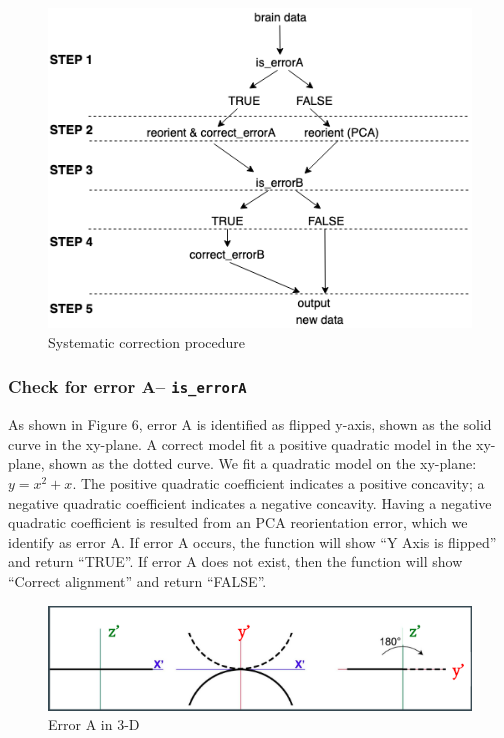 \documentclass[10pt,letterpaper]{article}
\begin{document}
\begin{figure}[H]
\includegraphics[width=0.9\linewidth]{visualization_paper/cranium_procedure} \caption{Systematic correction procedure}\label{fig:Figure5}
\end{figure}

\hypertarget{check-for-error-a-is_errora}{%
\subsubsection{\texorpdfstring{Check for error A--
\texttt{is\_errorA}}{Check for error A-- is\_errorA}}\label{check-for-error-a-is_errora}}

As shown in Figure 6, error A is identified as flipped y-axis, shown as
the solid curve in the xy-plane. A correct model fit a positive
quadratic model in the xy-plane, shown as the dotted curve. We fit a
quadratic model on the xy-plane: \(y=x^2 + x\). The positive quadratic
coefficient indicates a positive concavity; a negative quadratic
coefficient indicates a negative concavity. Having a negative quadratic
coefficient is resulted from an PCA reorientation error, which we
identify as error A. If error A occurs, the function will show ``Y Axis
is flipped'' and return ``TRUE''. If error A does not exist, then the
function will show ``Correct alignment'' and return ``FALSE''.

\begin{figure}[H]
\includegraphics[width=0.9\linewidth]{visualization_paper/error_correctionA} \caption{Error A in 3-D}\label{fig:Figure6}
\end{figure}
\end{document}
